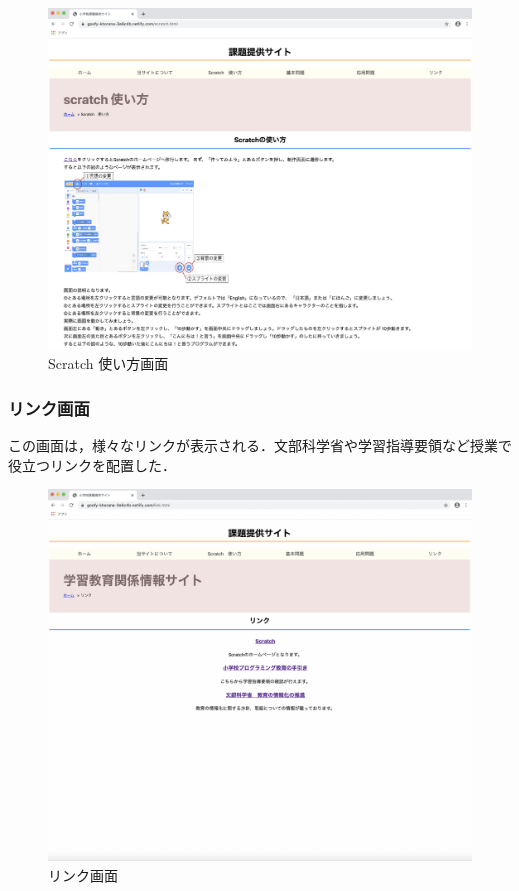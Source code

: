 \begin{figure}[h]
\begin{center}
\includegraphics[width=15cm]{Scratch.pdf}
\caption{Scratch 使い方画面}
\label{fig:houhou}
\end{center}
\end{figure}

\newpage

\subsubsection{リンク画面}
この画面は，様々なリンクが表示される．文部科学省や学習指導要領など授業で役立つリンクを配置した．

\begin{figure}[h]
\begin{center}
\includegraphics[width=15cm]{Link.pdf}
\caption{リンク画面}
\label{fig:houhou}
\end{center}
\end{figure}

